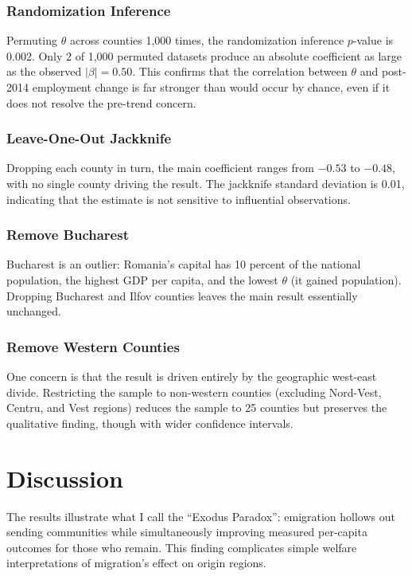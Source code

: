 \documentclass[12pt]{article}
\begin{document}
\subsubsection*{Randomization Inference} Permuting $\theta$ across counties 1,000 times, the randomization inference $p$-value is 0.002. Only 2 of 1,000 permuted datasets produce an absolute coefficient as large as the observed $|\beta| = 0.50$. This confirms that the correlation between $\theta$ and post-2014 employment change is far stronger than would occur by chance, even if it does not resolve the pre-trend concern.

\subsubsection*{Leave-One-Out Jackknife} Dropping each county in turn, the main coefficient ranges from $-0.53$ to $-0.48$, with no single county driving the result. The jackknife standard deviation is 0.01, indicating that the estimate is not sensitive to influential observations.

\subsubsection*{Remove Bucharest} Bucharest is an outlier: Romania's capital has 10 percent of the national population, the highest GDP per capita, and the lowest $\theta$ (it gained population). Dropping Bucharest and Ilfov counties leaves the main result essentially unchanged.

\subsubsection*{Remove Western Counties} One concern is that the result is driven entirely by the geographic west-east divide. Restricting the sample to non-western counties (excluding Nord-Vest, Centru, and Vest regions) reduces the sample to 25 counties but preserves the qualitative finding, though with wider confidence intervals.




\section{Discussion}

The results illustrate what I call the ``Exodus Paradox'': emigration hollows out sending communities while simultaneously improving measured per-capita outcomes for those who remain. This finding complicates simple welfare interpretations of migration's effect on origin regions.
\end{document}
